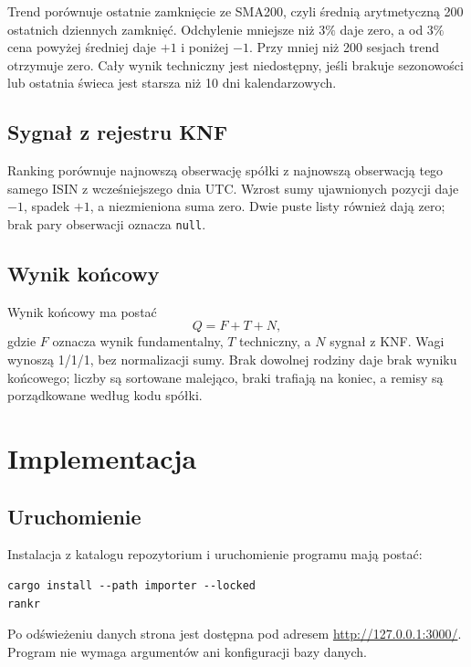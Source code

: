 \documentclass[12pt,a4paper,twoside]{report}
\begin{document}
Trend porównuje ostatnie zamknięcie ze SMA200, czyli średnią arytmetyczną 200 ostatnich dziennych zamknięć. Odchylenie mniejsze niż $3\%$ daje zero, a od $3\%$ cena powyżej średniej daje $+1$ i poniżej $-1$. Przy mniej niż 200 sesjach trend otrzymuje zero. Cały wynik techniczny jest niedostępny, jeśli brakuje sezonowości lub ostatnia świeca jest starsza niż 10 dni kalendarzowych.


\section{Sygnał z rejestru KNF}

Ranking porównuje najnowszą obserwację spółki z najnowszą obserwacją tego samego ISIN z wcześniejszego dnia UTC. Wzrost sumy ujawnionych pozycji daje $-1$, spadek $+1$, a niezmieniona suma zero. Dwie puste listy również dają zero; brak pary obserwacji oznacza \texttt{null}.


\section{Wynik końcowy}

Wynik końcowy ma postać
\begin{equation}
    Q=F+T+N,
\end{equation}
gdzie $F$ oznacza wynik fundamentalny, $T$ techniczny, a $N$ sygnał z KNF. Wagi wynoszą 1/1/1, bez normalizacji sumy. Brak dowolnej rodziny daje brak wyniku końcowego; liczby są sortowane malejąco, braki trafiają na koniec, a remisy są porządkowane według kodu spółki.

\cleardoublepage
\chapter{Implementacja}
\label{chap:implementation}

\section{Uruchomienie}

Instalacja z katalogu repozytorium i uruchomienie programu mają postać:
\begin{verbatim}
cargo install --path importer --locked
rankr
\end{verbatim}
Po odświeżeniu danych strona jest dostępna pod adresem \url{http://127.0.0.1:3000/}. Program nie wymaga argumentów ani konfiguracji bazy danych.
\end{document}
